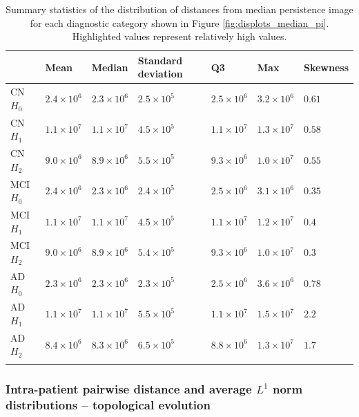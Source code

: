 \documentclass{article}
\begin{document}
\begin{table}
\centering
\begin{tabular}{lllllll}
  \toprule {}
  & Mean & Median & Standard deviation & Q3 & Max & Skewness \\
  \midrule
  CN $H_0$ & $2.4\times10^{6}$ & $2.3\times10^{6}$ & $2.5\times10^{5}$ & $2.5\times10^{6}$ & $3.2\times10^{6}$ & $0.61$ \\
  CN $H_1$ & $1.1\times10^{7}$ & $1.1\times10^{7}$ & $4.5\times10^{5}$ & $1.1\times10^{7}$ & $1.3\times10^{7}$ & $0.58$ \\
  CN $H_2$ & $9.0\times10^{6}$ & $8.9\times10^{6}$ & $5.5\times10^{5}$ & $9.3\times10^{6}$ & $1.0\times10^{7}$ & $0.55$ \\
  MCI $H_0$ & $2.4\times10^{6}$ & $2.3\times10^{6}$ & $2.4\times10^{5}$ & $2.5\times10^{6}$ & $3.1\times10^{6}$ & $0.35$ \\
  MCI $H_1$ & $1.1\times10^{7}$ & $1.1\times10^{7}$ & $4.5\times10^{5}$ & $1.1\times10^{7}$ & $1.2\times10^{7}$ & $0.4$ \\
  MCI $H_2$ & $9.0\times10^{6}$ & $8.9\times10^{6}$ & $5.4\times10^{5}$ & $9.3\times10^{6}$ & $1.0\times10^{7}$ & $0.3$ \\
  AD $H_0$ & $2.3\times10^{6}$ & $2.3\times10^{6}$ & $2.3\times10^{5}$ & $2.5\times10^{6}$ & $3.6\times10^{6}$ & $0.78$ \\
  AD $H_1$ & $1.1\times10^{7}$ & $1.1\times10^{7}$ & $5.5\times10^{5}$ & $1.1\times10^{7}$ & $1.5\times10^{7}$ & $\mathbf{2.2}$ \\
  AD $H_2$ & $8.4\times10^{6}$ & $8.3\times10^{6}$ & $6.5\times10^{5}$ & $8.8\times10^{6}$ & $1.3\times10^{7}$ & $\mathbf{1.7}$ \\
  \bottomrule
  \vspace{1pt}
\end{tabular}
\caption{Summary statistics of the distribution of distances from median persistence image for each
diagnostic category shown in Figure \ref{fig:displots_median_pi}. Highlighted values represent
relatively high values.}
\label{tab:stats_median_pi}
\end{table}



\subsubsection{Intra-patient pairwise distance and average $L^1$ norm distributions -- topological
  evolution}
\end{document}

